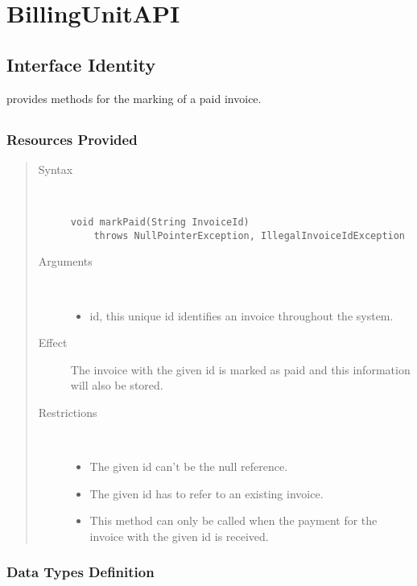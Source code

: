 \section{BillingUnitAPI}
\label{api:other-billing-unit-api}

\subsection{Interface Identity}

\npar {} provides methods for the marking of a paid
invoice.

\subsection{}

\subsubsection{Resources Provided}

\begin{quote}
	\begin{description}
		\item[Syntax] \
		\begin{verbatim}
void markPaid(String InvoiceId)
    throws NullPointerException, IllegalInvoiceIdException
		\end{verbatim}
		\item[Arguments] \
		\begin{itemize}
		  \item id, this unique id identifies an invoice throughout the system.
		\end{itemize}
		\item[Effect] The invoice with the given id is marked as paid and this
		information will also be stored. 
		\item[Restrictions] \
		\begin{itemize}
		  \item The given id can't be the null reference.
		  \item The given id has to refer to an existing invoice.
		  \item This method can only be called when the payment for the invoice with
		  the given id is received.
		\end{itemize}
	\end{description} 
\end{quote}

\subsubsection{Data Types Definition}

